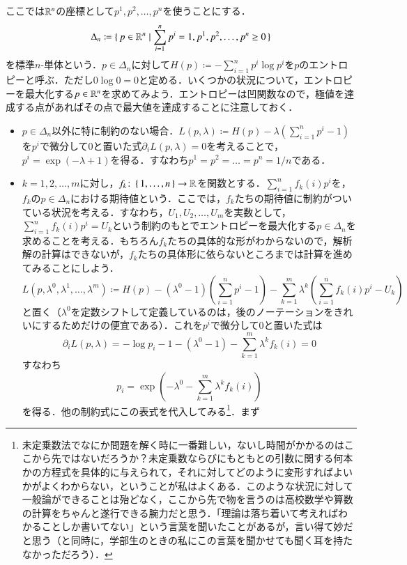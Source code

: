 \begin{exm}
ここでは$\mathbb{R}^n$の座標として$p^1, p^2, \dots, p^n$を使うことにする．
\begin{equation}
\Delta_n \coloneqq \set{ p \in \mathbb{R}^n | \sum_{i=1}^n p^i = 1, p^1, p^2, \dots, p^n \geq 0 }
\end{equation}
を標準$n$-単体という．$p \in \Delta_n$に対して$H(p) \coloneqq -\sum_{i=1}^n p^i \log p^i$を$p$のエントロピーと呼ぶ．ただし$0 \log 0=0$と定める．いくつかの状況について，エントロピーを最大化する$p \in \mathbb{R}^n$を求めてみよう．エントロピーは凹関数なので，極値を達成する点があればその点で最大値を達成することに注意しておく．
\begin{itemize}
\item $p \in \Delta_n$以外に特に制約のない場合．$L(p,\lambda) \coloneqq H(p) - \lambda (\sum_{i=1}^n p^i - 1)$を$p^i$で微分して0と置いた式$\partial_i L(p,\lambda)=0$を考えることで，$p^i = \exp(-\lambda+1)$を得る．すなわち$p^1 = p^2 = \dots =p^n = 1/n$である．
\item $k=1,2,\dots,m$に対し，$f_k \colon \set{1,\dots,n} \to \mathbb{R}$を関数とする．$\sum_{i=1}^n f_k(i) p^i$を，$f_k$の$p \in \Delta_n$における期待値という．ここでは，$f_k$たちの期待値に制約がついている状況を考える．すなわち，$U_1, U_2, \dots, U_m$を実数として，$\sum_{i=1}^n f_k(i) p^i = U_k$という制約のもとでエントロピーを最大化する$p \in \Delta_n$を求めることを考える．もちろん$f_k$たちの具体的な形がわからないので，解析解の計算はできないが，$f_k$たちの具体形に依らないところまでは計算を進めてみることにしよう．
\begin{equation}
L(p, \lambda^0, \lambda^1, \dots, \lambda^m) \coloneqq H(p) - (\lambda^0-1) \left(\sum_{i=1}^n p^i - 1\right) - \sum_{k=1}^m \lambda^k \left(\sum_{i=1}^n f_k(i) p^i - U_k\right)
\end{equation}と置く（$\lambda^0$を定数シフトして定義しているのは，後のノーテーションをきれいにするためだけの便宜である）．これを$p^i$で微分して0と置いた式は
\begin{equation}
\partial_i L(p,\lambda) = -\log p_i - 1 - (\lambda^0 - 1) - \sum_{k=1}^m \lambda^k f_k(i) =0
\end{equation}すなわち
\begin{equation}
p_i = \exp\left(- \lambda^0 - \sum_{k=1}^m \lambda^k f_k(i) \right)
\end{equation}を得る．他の制約式にこの表式を代入してみる\footnote{未定乗数法でなにか問題を解く時に一番難しい，ないし時間がかかるのはここから先ではないだろうか？未定乗数ならびにもともとの引数に関する何本かの方程式を具体的に与えられて，それに対してどのように変形すればよいかがよくわからない，ということが私はよくある．このような状況に対して一般論ができることは殆どなく，ここから先で物を言うのは高校数学や算数の計算をちゃんと遂行できる腕力だと思う．「理論は落ち着いて考えればわかることしか書いてない」という言葉を聞いたことがあるが，言い得て妙だと思う（と同時に，学部生のときの私にこの言葉を聞かせても聞く耳を持たなかっただろう）．}．まず

\end{itemize}
\end{exm}
